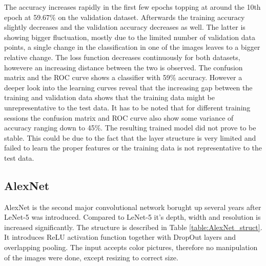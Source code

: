 \documentclass[10pt, final]{article}
\begin{document}
The accuracy increases rapidly in the first few epochs topping at around the 10th epoch at 59.67\% on the
validation dataset.
Afterwards the training accuracy slightly decreases and the validation accuracy decreases as well.
The latter is showing bigger fluctuation, mostly due to the limited number of validation data points, a single
change in the classification in one of the images leaves to a bigger relative change.
The loss function decreases continuously for both datasets, howevere an increasing distance between the two
is observed.
The confusion matrix and the ROC curve shows a classifier with 59\% accuracy.
However a deeper look into the learning curves reveal that the increasing gap between the training and validation
data shows that the training data might be unrepresentative to the test data.
It has to be noted that for different training sessions the confusion matrix and ROC curve also show some
variance of accuracy ranging down to 45\%.
The resulting trained model did not prove to be stable.
This could be due to the fact that the layer structure is very limited and failed to learn the proper features
or the training data is not representative to the test data.

\subsection{AlexNet} \label{sec:AlexNet}
AlexNet is the second major convolutional network borught up several years after LeNet-5 was introduced.
Compared to LeNet-5 it's depth, width and resolution is increased significantly.
The structure is described in Table \ref{table:AlexNet_struct}.
It introduces ReLU activation function together with DropOut layers and overlapping pooling.
The input accepts color pictures, therefore no manipulation of the images were done, except resizing to
correct size.
\end{document}
